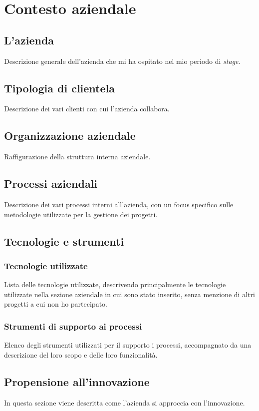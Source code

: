 \chapter{Contesto aziendale}
\label{chap:contesto-aziendale}

\section{L'azienda}\noindent
Descrizione generale dell'azienda che mi ha ospitato nel mio periodo di \textit{stage}.

\section{Tipologia di clientela}\noindent
Descrizione dei vari clienti con cui l'azienda collabora.

\section{Organizzazione aziendale}\noindent
Raffigurazione della struttura interna aziendale.

\section{Processi aziendali}\noindent
Descrizione dei vari processi interni all'azienda,  con un focus specifico sulle metodologie utilizzate per la gestione dei progetti.

\section{Tecnologie e strumenti}

\subsection{Tecnologie utilizzate}\noindent
Lista delle tecnologie utilizzate, descrivendo principalmente le tecnologie utilizzate nella sezione aziendale in cui sono stato inserito, senza menzione di altri progetti a cui non ho partecipato.

\subsection{Strumenti di supporto ai processi}\noindent
Elenco degli strumenti utilizzati per il supporto i processi, accompagnato da una descrizione del loro scopo e delle loro funzionalità.

\section{Propensione all'innovazione}\noindent
In questa sezione viene descritta come l'azienda si approccia con l'innovazione.